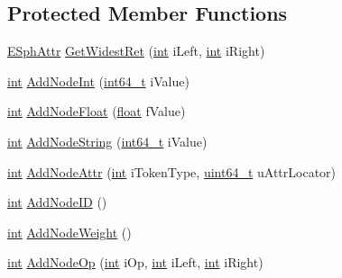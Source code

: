 \subsection*{Protected Member Functions}
\begin{DoxyCompactItemize}
\item 
\hyperlink{sphinxexpr_8h_aa883df0db2e4468a107fdd2d2ae625a3}{E\-Sph\-Attr} \hyperlink{classExprParser__t_a631dda826b81594b5cfc161c0945c208}{Get\-Widest\-Ret} (\hyperlink{sphinxexpr_8cpp_a4a26e8f9cb8b736e0c4cbf4d16de985e}{int} i\-Left, \hyperlink{sphinxexpr_8cpp_a4a26e8f9cb8b736e0c4cbf4d16de985e}{int} i\-Right)
\item 
\hyperlink{sphinxexpr_8cpp_a4a26e8f9cb8b736e0c4cbf4d16de985e}{int} \hyperlink{classExprParser__t_a26d515786b19a9c3128a561ff372b688}{Add\-Node\-Int} (\hyperlink{sphinxstd_8h_a996e72f71b11a5bb8b3b7b6936b1516d}{int64\-\_\-t} i\-Value)
\item 
\hyperlink{sphinxexpr_8cpp_a4a26e8f9cb8b736e0c4cbf4d16de985e}{int} \hyperlink{classExprParser__t_a8ec29b490970876b05b60b7b23193403}{Add\-Node\-Float} (\hyperlink{sphinxexpr_8cpp_a0e0d0739f7035f18f949c2db2c6759ec}{float} f\-Value)
\item 
\hyperlink{sphinxexpr_8cpp_a4a26e8f9cb8b736e0c4cbf4d16de985e}{int} \hyperlink{classExprParser__t_acb5837679dcc68f85ce29bc54b661bf1}{Add\-Node\-String} (\hyperlink{sphinxstd_8h_a996e72f71b11a5bb8b3b7b6936b1516d}{int64\-\_\-t} i\-Value)
\item 
\hyperlink{sphinxexpr_8cpp_a4a26e8f9cb8b736e0c4cbf4d16de985e}{int} \hyperlink{classExprParser__t_a047a78318a5657f2602dd6c8929f4659}{Add\-Node\-Attr} (\hyperlink{sphinxexpr_8cpp_a4a26e8f9cb8b736e0c4cbf4d16de985e}{int} i\-Token\-Type, \hyperlink{sphinxstd_8h_aaa5d1cd013383c889537491c3cfd9aad}{uint64\-\_\-t} u\-Attr\-Locator)
\item 
\hyperlink{sphinxexpr_8cpp_a4a26e8f9cb8b736e0c4cbf4d16de985e}{int} \hyperlink{classExprParser__t_a99b4bfc0631a7976a2afe75cd9163ee1}{Add\-Node\-I\-D} ()
\item 
\hyperlink{sphinxexpr_8cpp_a4a26e8f9cb8b736e0c4cbf4d16de985e}{int} \hyperlink{classExprParser__t_ae7f40744671280e06c5b350fd3eaa301}{Add\-Node\-Weight} ()
\item 
\hyperlink{sphinxexpr_8cpp_a4a26e8f9cb8b736e0c4cbf4d16de985e}{int} \hyperlink{classExprParser__t_a9ddc48ca545d05a19e37c6969b7a43bc}{Add\-Node\-Op} (\hyperlink{sphinxexpr_8cpp_a4a26e8f9cb8b736e0c4cbf4d16de985e}{int} i\-Op, \hyperlink{sphinxexpr_8cpp_a4a26e8f9cb8b736e0c4cbf4d16de985e}{int} i\-Left, \hyperlink{sphinxexpr_8cpp_a4a26e8f9cb8b736e0c4cbf4d16de985e}{int} i\-Right)

\end{DoxyCompactItemize}
